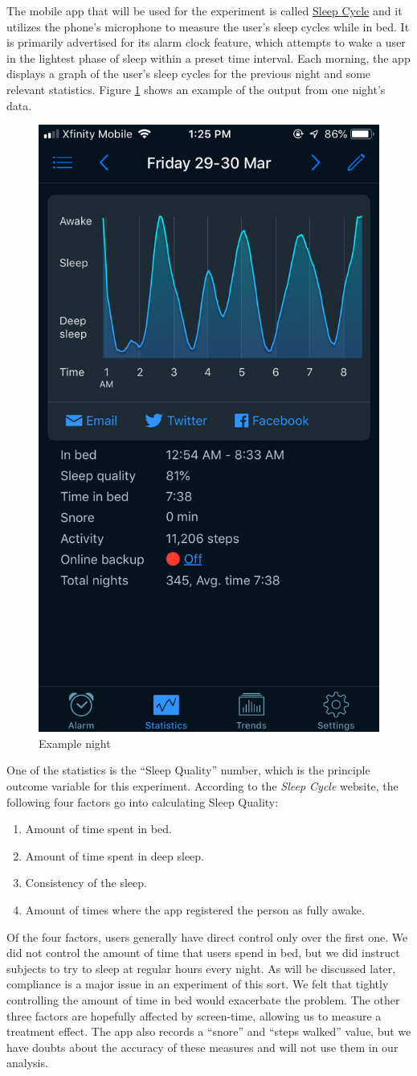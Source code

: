 \documentclass[12pt,]{article}
\providecommand{\tightlist}{%
  \setlength{\itemsep}{0pt}\setlength{\parskip}{0pt}}
\begin{document}
The mobile app that will be used for the experiment is called
\href{www.sleepcycle.com}{Sleep Cycle} and it utilizes the phone's
microphone to measure the user's sleep cycles while in bed. It is
primarily advertised for its alarm clock feature, which attempts to wake
a user in the lightest phase of sleep within a preset time interval.
Each morning, the app displays a graph of the user's sleep cycles for
the previous night and some relevant statistics. Figure
\ref{fig:example_night} shows an example of the output from one night's
data.

\begin{figure}[H]

{\centering \includegraphics[width=0.25\linewidth]{img/example_night} 

}

\caption{Example night}\label{fig:example_night}
\end{figure}

One of the statistics is the ``Sleep Quality'' number, which is the
principle outcome variable for this experiment. According to the
\emph{Sleep Cycle} website, the following four factors go into
calculating Sleep Quality:

\begin{enumerate}
\def\labelenumi{\arabic{enumi}.}
\tightlist
\item
  Amount of time spent in bed.
\item
  Amount of time spent in deep sleep.
\item
  Consistency of the sleep.
\item
  Amount of times where the app registered the person as fully awake.
\end{enumerate}

Of the four factors, users generally have direct control only over the
first one. We did not control the amount of time that users spend in
bed, but we did instruct subjects to try to sleep at regular hours every
night. As will be discussed later, compliance is a major issue in an
experiment of this sort. We felt that tightly controlling the amount of
time in bed would exacerbate the problem. The other three factors are
hopefully affected by screen-time, allowing us to measure a treatment
effect. The app also records a ``snore'' and ``steps walked'' value, but
we have doubts about the accuracy of these measures and will not use
them in our analysis.
\end{document}
